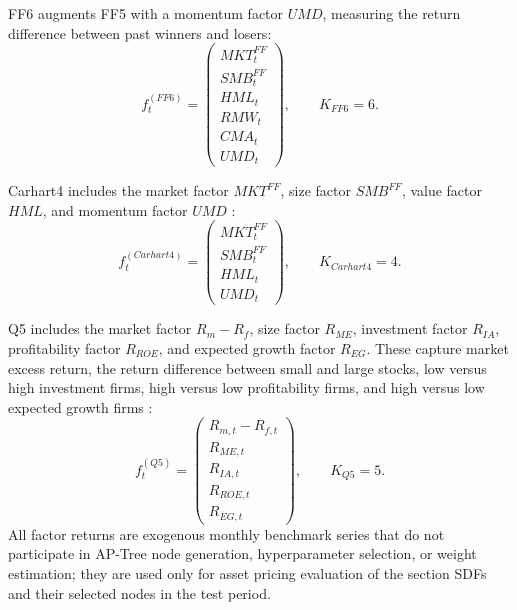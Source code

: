 \documentclass[12pt]{article}
\def\bm#1{#1}%
\def\mathrm#1{#1}%
\begin{document}
FF6 augments FF5 with a momentum factor \(\mathrm{UMD}\), measuring the return difference between past winners and losers:
\begin{equation}
  \bm f_t^{(\mathrm{FF6})}
  =
  \begin{pmatrix}
    \mathrm{MKT}_t^{FF}\\
    \mathrm{SMB}_t^{FF}\\
    \mathrm{HML}_t\\
    \mathrm{RMW}_t\\
    \mathrm{CMA}_t\\
    \mathrm{UMD}_t
  \end{pmatrix},
  \qquad K_{\mathrm{FF6}}=6.
  \label{eq:ff6}
\end{equation}

Carhart4 includes the market factor \(\mathrm{MKT}^{FF}\), size factor \(\mathrm{SMB}^{FF}\), value factor \(\mathrm{HML}\), and momentum factor \(\mathrm{UMD}\) \cite{ref4}:
\begin{equation}
  \bm f_t^{(\mathrm{Carhart4})}
  =
  \begin{pmatrix}
    \mathrm{MKT}_t^{FF}\\
    \mathrm{SMB}_t^{FF}\\
    \mathrm{HML}_t\\
    \mathrm{UMD}_t
  \end{pmatrix},
  \qquad K_{\mathrm{Carhart4}}=4.
  \label{eq:carhart4}
\end{equation}

Q5 includes the market factor \(R_m-R_f\), size factor \(R_{\mathrm{ME}}\), investment factor \(R_{\mathrm{IA}}\), profitability factor \(R_{\mathrm{ROE}}\), and expected growth factor \(R_{\mathrm{EG}}\). These capture market excess return, the return difference between small and large stocks, low versus high investment firms, high versus low profitability firms, and high versus low expected growth firms \cite{ref23,ref24}:
\begin{equation}
  \bm f_t^{(\mathrm{Q5})}
  =
  \begin{pmatrix}
    R_{m,t}-R_{f,t}\\
    R_{\mathrm{ME},t}\\
    R_{\mathrm{IA},t}\\
    R_{\mathrm{ROE},t}\\
    R_{\mathrm{EG},t}
  \end{pmatrix},
  \qquad K_{\mathrm{Q5}}=5.
  \label{eq:q5}
\end{equation}
All factor returns are exogenous monthly benchmark series that do not participate in AP-Tree node generation, hyperparameter selection, or weight estimation; they are used only for asset pricing evaluation of the section SDFs and their selected nodes in the test period.
\end{document}

